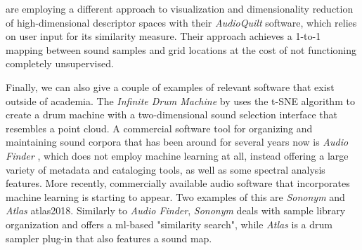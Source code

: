 \smallskip

\citet{fried2014} are employing a different approach to visualization and
dimensionality reduction of high-dimensional descriptor spaces with their
\textit{AudioQuilt} software, which relies on user input for its similarity
measure. Their approach achieves a 1-to-1 mapping between sound samples and
grid locations at the cost of not functioning completely unsupervised.

\smallskip

Finally, we can also give a couple of examples of relevant software that exist
outside of academia. The \textit{Infinite Drum Machine} by \citet{mcdonald2017}
uses the t-SNE algorithm \citep{maaten2008} to create a drum machine with a
two-dimensional sound selection interface that resembles a point cloud. A
commercial software tool for organizing and maintaining sound corpora that has
been around for several years now is \textit{Audio Finder}
\citep{audiofinder2019}, which does not employ machine learning at all, instead
offering a large variety of metadata and cataloging
tools, as well as some spectral analysis features. More recently, commercially
available audio software that incorporates machine learning is starting to
appear. Two examples of this are \textit{Sononym} \citep{nielsen2018} and
\textit{Atlas} {atlas2018}. Similarly to \textit{Audio Finder}, \textit{Sononym}
deals with sample library organization and offers a \gls{ml}-based
"similarity search", while \textit{Atlas} is a drum sampler plug-in that also
features a sound map.
